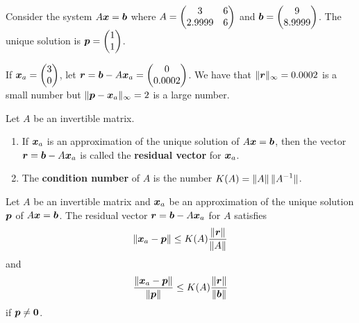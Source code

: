 \begin{egg}
Consider the system $A\bm{x} = \bm{b}$ where
$\displaystyle
A = \begin{pmatrix}
3 & 6 \\
2.9999 & 6
\end{pmatrix}$ and
$\displaystyle
\bm{b} = \begin{pmatrix}
9 \\ 8.9999
\end{pmatrix}
$.
The unique solution is
$\displaystyle
\bm{p} = \begin{pmatrix}
1 \\ 1
\end{pmatrix}
$.

If
$\displaystyle
\bm{x}_a = \begin{pmatrix}
3 \\ 0
\end{pmatrix}
$, let
$\displaystyle
\bm{r} = \bm{b} - A\bm{x}_a =
\begin{pmatrix}
0 \\ 0.0002
\end{pmatrix}$.
We have that $\|\bm{r}\|_\infty = 0.0002$ is a small number but
$\|\bm{p} - \bm{x}_a\|_\infty = 2$ is a large number.
\end{egg}

\begin{defn}
Let $A$ be an invertible \nn matrix.
\begin{enumerate}
\item If $\bm{x}_a$ is an approximation of the unique solution of
$A\bm{x} = \bm{b}$, then the vector
$\bm{r} = \bm{b} - A \bm{x}_a$ is 
called the {\bfseries residual vector} for $\bm{x}_a$.
\item The {\bfseries condition number} of $A$
is the number
$\displaystyle K(A) = \| A \| \, \|A^{-1} \|$.
\end{enumerate}
\end{defn}

\begin{theorem} \label{ResErrCondNbr}
Let $A$ be an invertible matrix and $\bm{x}_a$ be an approximation
of the unique solution $\bm{p}$ of $A\bm{x} = \bm{b}$. The residual
vector $\bm{r} = \bm{b} - A \bm{x}_a$ for $A$ satisfies
\[
\| \bm{x}_a - \bm{p} \| \leq K(A) \frac{\|\bm{r}\|}{\|A\|}
\]
and
\[
\frac{\| \bm{x}_a - \bm{p} \|}{\| \bm{p} \|} \leq K(A)
\frac{\|\bm{r}\|}{\|\bm{b} \|}
\]
if $\bm{p} \neq \bm{0}$.
\end{theorem}

